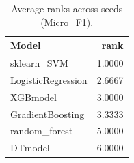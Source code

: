 \begin{table}[t]
\centering
\begin{tabular}{lr}
\toprule
Model & rank \\
\midrule
sklearn_SVM & 1.0000 \\
LogisticRegression & 2.6667 \\
XGBmodel & 3.0000 \\
GradientBoosting & 3.3333 \\
random_forest & 5.0000 \\
DTmodel & 6.0000 \\
\bottomrule
\end{tabular}
\caption{Average ranks across seeds (Micro_F1).}
\label{tab:avg_rank_Micro_F1}
\end{table}